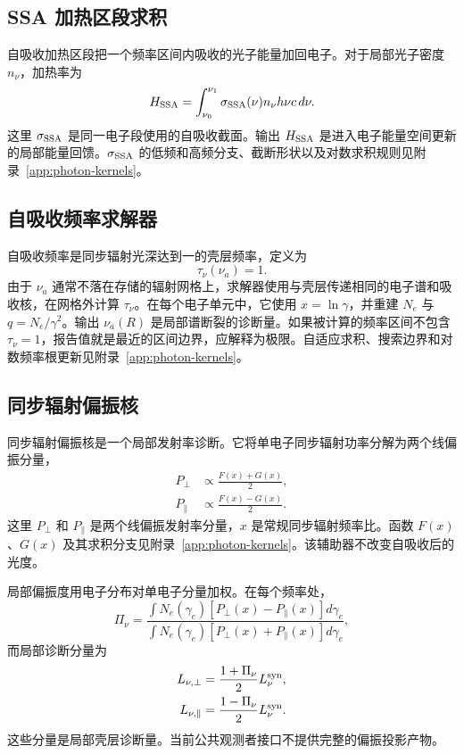 \documentclass[twocolumn]{aastex702}
\begin{document}
\subsection{SSA 加热区段求积}

自吸收加热区段把一个频率区间内吸收的光子能量加回电子。对于局部光子密度 \(n_\nu\)，加热率为
\begin{equation}
\begin{aligned}
H_{\rm SSA}=
\int_{\nu_0}^{\nu_1}\sigma_{\rm SSA}(\nu)n_\nu h\nu c\,d\nu .
\end{aligned}
\end{equation}
这里 \(\sigma_{\rm SSA}\) 是同一电子段使用的自吸收截面。输出 \(H_{\rm SSA}\) 是进入电子能量空间更新的局部能量回馈。\(\sigma_{\rm SSA}\) 的低频和高频分支、截断形状以及对数求积规则见附录~\ref{app:photon-kernels}。

\subsection{自吸收频率求解器}

自吸收频率是同步辐射光深达到一的壳层频率，定义为
\begin{equation}
\tau_\nu(\nu_a)=1 .
\end{equation}
由于 \(\nu_a\) 通常不落在存储的辐射网格上，求解器使用与壳层传递相同的电子谱和吸收核，在网格外计算 \(\tau_\nu\)。在每个电子单元中，它使用 \(x=\ln\gamma\)，并重建 \(N_e\) 与 \(q=N_e/\gamma^2\)。输出 \(\nu_a(R)\) 是局部谱断裂的诊断量。如果被计算的频率区间不包含 \(\tau_\nu=1\)，报告值就是最近的区间边界，应解释为极限。自适应求积、搜索边界和对数频率根更新见附录~\ref{app:photon-kernels}。

\subsection{同步辐射偏振核}

同步辐射偏振核是一个局部发射率诊断。它将单电子同步辐射功率分解为两个线偏振分量，
\begin{equation}
\begin{aligned}
P_\perp&\propto\frac{F(x)+G(x)}{2},\\
P_\parallel&\propto\frac{F(x)-G(x)}{2}.
\end{aligned}
\end{equation}
这里 \(P_\perp\) 和 \(P_\parallel\) 是两个线偏振发射率分量，\(x\) 是常规同步辐射频率比。函数 \(F(x)\)、\(G(x)\) 及其求积分支见附录~\ref{app:photon-kernels}。该辅助器不改变自吸收后的光度。

局部偏振度用电子分布对单电子分量加权。在每个频率处，
\begin{equation}
\Pi_\nu=
\frac{\int N_e(\gamma_e)[P_\perp(x)-P_\parallel(x)]d\gamma_e}
{\int N_e(\gamma_e)[P_\perp(x)+P_\parallel(x)]d\gamma_e},
\end{equation}
而局部诊断分量为
\begin{equation}
\begin{aligned}
L_{\nu,\perp}&=\frac{1+\Pi_\nu}{2}L_\nu^{\rm syn},\\
L_{\nu,\parallel}&=\frac{1-\Pi_\nu}{2}L_\nu^{\rm syn}.
\end{aligned}
\end{equation}
这些分量是局部壳层诊断量。当前公共观测者接口不提供完整的偏振投影产物。
\end{document}
